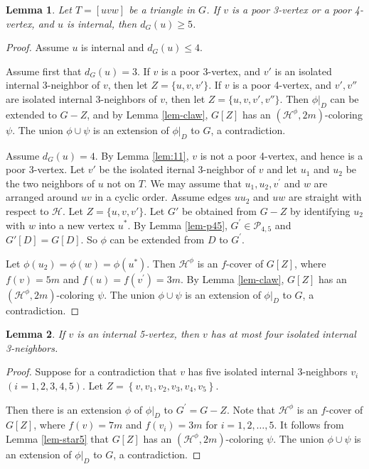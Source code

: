 \documentclass{article}
\newtheorem{lemma}{Lemma}
\begin{document}
\begin{lemma}
\label{lem:12}
    Let $T=[uvw]$ be a triangle in $G$. If $v$ is a poor 3-vertex or a poor 4-vertex, and $u$  is internal, then $d_G(u) \ge 5$.
\end{lemma}

\begin{proof}
    Assume $u$ is internal and $d_G(u) \le 4$. 

    Assume first that $d_G(u)=3$. If $v$ is a poor 3-vertex, and $v'$ is an isolated internal 3-neighbor of $v$, then let  $Z=\{u,v, v'\}$. If $v$ is a poor 4-vertex, and $v', v''$ are isolated internal 3-neighbors of $v$, then let  $Z=\{u,v, v', v''\}$.  Then $\phi|_D$ can be extended to $G-Z$, and by Lemma \ref{lem-claw}, $G[Z]$ has an $(\mathcal{H}^{\phi}, 2m)$-coloring $\psi$. The union $\phi \cup \psi$ is an extension of $\phi|_D$ to $G$, a contradiction.  
    
   Assume $d_G(u)=4$.  By Lemma \ref{lem:11},  $v$ is not a poor 4-vertex, and hence is a poor 3-vertex. Let $v'$ be the isolated iternal 3-neighbor of $v$ and let  $u_1$ and $u_2$ be the two neighbors of $u$ not on $T$. We may assume that $u_1,u_2,v^{\prime}$ and $w$ are arranged around $uv$ in a cyclic order. Assume edges $uu_2$ and $uw$ are straight with respect to  $\mathcal{H}$.  Let $Z=\{u,v, v'\}$. Let $G'$ be obtained from $G-Z$ by identifying  $u_2$ with $w$ into a new vertex $u^*$.  By Lemma \ref{lem-p45},  $G^{\prime} \in \mathcal{P}_{4,5}$ and $G'[D] = G[D]$. So $\phi$ can be extended from $D$ to $G^{\prime}$. 
     
     Let $\phi(u_2)=\phi(w)=\phi(u^*) $. Then  $\mathcal{H}^{\phi}$ is an $f$-cover of $G[Z]$, where $f(v)= 5m$ and $f(u)=f(v^{\prime})=3m$. By Lemma \ref{lem-claw},  $G[Z]$ has an $(\mathcal{H}^{\phi},2m)$-coloring $\psi$. The union $\phi \cup \psi$ is an extension of $\phi|_D$ to $G$, a contradiction.
\end{proof}

\begin{lemma}
\label{lem:13}
    If $v$ is an internal   5-vertex, then $v$ has at most four isolated internal 3-neighbors.
\end{lemma}

\begin{proof}
     Suppose for a contradiction that $v$ has five isolated internal 3-neighbors   $v_i$ $ (i=1,2,3,4,5)$. Let $Z=\left \{v, v_1,v_2,v_3,v_4,v_5  \right \} $. 
     
     Then there is an extension  $\phi$ of $\phi|_D$ to $G^{\prime}=G-Z$.  Note that $\mathcal{H}^{\phi}$ is an $f$-cover of $G[Z]$, where $f(v)=7m$ and $f(v_i)=3m$ for $i=1,2,\ldots, 5$.  It follows from Lemma \ref{lem-star5} that $G[Z]$ has an $(\mathcal{H}^{\phi}, 2m)$-coloring $\psi$. The union $\phi \cup \psi$ is an extension of $\phi|_D$ to $G$,   a contradiction.
\end{proof}
\end{document}
